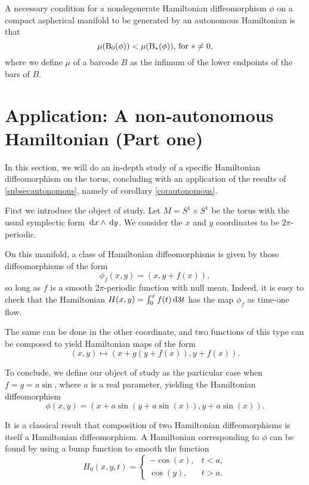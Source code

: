 \begin{corollary}\label{corautonomous}
A necessary condition for a nondegenerate Hamiltonian diffeomorphism $\phi$ on a compact aspherical manifold to be generated by an autonomous Hamiltonian is that
\begin{equation}
\mu(\mathrm{B}_0(\phi)) < \mu(\mathrm{B}_*(\phi))\text{, for $* \neq 0$,}
\end{equation}
where we define $\mu$ of a barcode $B$ as the infimum of the lower endpoints of the bars of $B$.
\end{corollary}


\section{Application: A non-autonomous Hamiltonian (Part one)}

In this section, we will do an in-depth study of a specific Hamiltonian diffeomorphism on the torus, concluding with an application of the results of \ref{subsecautonomous}, namely of corollary \ref{corautonomous}.

First we introduce the object of study. Let $M = S^1 \times S^1$ be the torus with the usual symplectic form $\dl x \wedge \dl y$. We consider the $x$ and $y$ coordinates to be $2\pi$-periodic.

On this manifold, a class of Hamiltonian diffeomorphisms is given by those diffeomorphisms of the form
\begin{equation}
\phi_f(x,y) = (x, y + f(x)),
\end{equation}
so long as $f$ is a smooth $2\pi$-periodic function with null mean. Indeed, it is easy to check that the Hamiltonian $H(x,y) = \int_0^x f(t) \dl3 t$ has the map $\phi_f$ as time-one flow.

The same can be done in the other coordinate, and two functions of this type can be composed to yield Hamiltonian maps of the form
\begin{equation}
(x,y) \mapsto (x + g(y+f(x)), y+f(x)).
\end{equation}

To conclude, we define our object of study as the particular case when $f = g = a \sin$, where $a$ is a real parameter, yielding the Hamiltonian diffeomorphism
\begin{equation}
\phi(x,y) = ( x + a \sin(y + a \sin(x)), y + a \sin(x)).
\end{equation}

It is a classical result that composition of two Hamiltonian diffeomorphisms is itself a Hamiltonian diffeomorphism. A Hamiltonian corresponding to $\phi$ can be found by using a bump function to smooth the function
\begin{equation}
H_0(x,y,t) = \begin{cases}
-\cos(x), & t < a,\\
\cos(y), & t > a.
\end{cases}
\end{equation}

